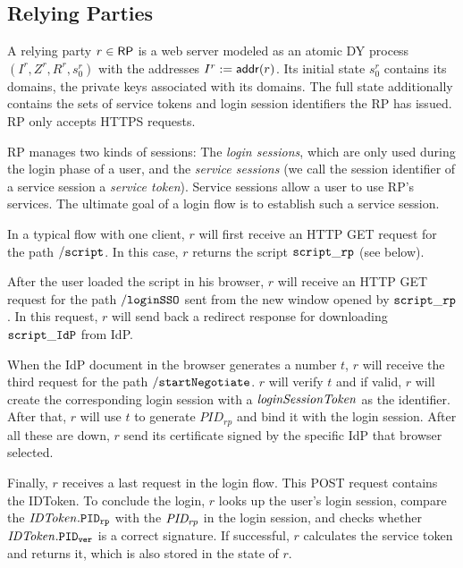   \subsection{Relying Parties} \label{app:relying-parties-uppresso}
  
  A relying party $r \in \mathsf{RP}$ is a web server modeled as an atomic
  DY process $(I^r, Z^r, R^r, s^r_0)$ with the addresses $I^r :=
  \mathsf{addr}(r)$. Its initial state $s^r_0$ contains its domains,
  the private keys associated with its domains.
  The full state additionally contains the sets of service tokens and login 
  session identifiers the RP has issued. RP only accepts HTTPS requests.
  
  RP manages two kinds of sessions: The \emph{login sessions}, which are
  only used during the login phase of a user, and the \emph{service
    sessions} (we call the session identifier of a service session a
  \emph{service token}). Service sessions allow a user to use RP's
  services. The ultimate goal of a login flow is to establish such a
  service session.
  
  In a typical flow with one client, $r$ will first receive an HTTP GET
  request for the path $\mathtt{/script}$. In this case, $r$ returns the script
  $\mathtt{script\_rp}$ (see below).
  
  After the user loaded the script in his browser, $r$ will receive an 
  HTTP GET request for the path $\mathtt{/loginSSO}$ sent from the new window opened
  by $\mathtt{script\_rp}$. In this request, $r$ will send back a redirect response  
  for downloading $\mathtt{script\_IdP}$ from IdP.
  
  When the IdP document in the browser generates a number $t$,
  $r$ will receive the third request for the path $\mathtt{/startNegotiate}$.
  $r$ will verify $t$ and if valid, $r$ will create the corresponding 
  login session with a $\mathit{loginSessionToken}$ as the identifier. After that,
  $r$ will use $t$ to generate $PID_{rp}$ and bind it with the login session.
  After all these are down, $r$ send its certificate signed by the specific IdP that browser selected.
  
  Finally, $r$ receives a last request in the login flow. This POST request 
  contains the IDToken. To conclude the login, $r$ looks up the user's login session, 
  compare the $\mathit{IDToken}.\mathtt{PID_{rp}}$ with the $\mathit{PID_{rp}}$ in the login session, and checks 
  whether $\mathit{IDToken}.\mathtt{PID_{ver}}$ is a correct signature. If successful, $r$ calculates the 
  service token and returns it, which is also stored in the state of $r$.
  
